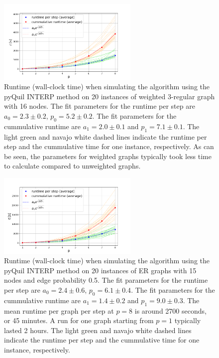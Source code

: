 \begin{figure}[H]
	\centering
	\includegraphics[width=0.6\textwidth]{figures/interp/runtime_16-nodal_weighted.png}
	\caption{Runtime (wall-clock time) when simulating the algorithm using the pyQuil INTERP method on 20 instances of weighted 3-regular graph with 16 nodes. The fit parameters for the runtime per step are $a_0 = 2.3 \pm 0.2$, $p_0 = 5.2 \pm 0.2$. The fit parameters for the cummulative runtime are $a_1 = 2.0\pm 0.1$ and $p_1 = 7.1\pm 0.1$. The light green and navajo white dashed lines indicate the runtime per step and the cummulative time for one instance, respectively. As can be seen, the parameters for weighted graphs typically took less time to calculate compared to unweighted graphs.}
\end{figure}

\begin{figure}[H]
	\centering
	\includegraphics[width=0.6\textwidth]{figures/interp/runtime_15-nodal_ER050.png}
	\caption{Runtime (wall-clock time) when simulating the algorithm using the pyQuil INTERP method on 20 instances of ER graphs with 15 nodes and edge probability 0.5. The fit parameters for the runtime per step are $a_0 = 2.4 \pm 0.6$, $p_0 = 6.1 \pm 0.4$. The fit parameters for the cummulative runtime are $a_1 = 1.4\pm 0.2$ and $p_1 = 9.0\pm0.3$. The mean runtime per graph per step at $p=8$ is around 2700 seconds, or 45 minutes. A run for one graph starting from $p=1$ typically lasted 2 hours. The light green and navajo white dashed lines indicate the runtime per step and the cummulative time for one instance, respectively.}
\end{figure}

